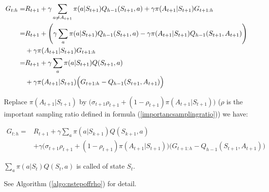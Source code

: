 \begin{equation}
	\begin{split}
		G_{t:h} =& R_{t+1}+\gamma \sum_{a\neq A_{t+1}} \pi(a|S_{t+1}) Q_{h-1}(S_{t+1},a) + \gamma \pi(A_{t+1}|S_{t+1})G_{t+1:h} \\
		=& R_{t+1} + \mleft (\gamma \sum_a \pi(a|S_{t+1})Q_{h-1}(S_{t+1},a) - \gamma \pi(A_{t+1}|S_{t+1})Q_{h-1}(S_{t+1},A_{t+1}) \mright)\\
		&+ \gamma \pi(A_{t+1}|S_{t+1})G_{t+1:h} \\
		=& R_{t+1} + \gamma \sum_a \pi(a|S_{t+1})Q(S_{t+1},a) \\
		&+ \gamma \pi(A_{t+1}|S_{t+1})\Big (G_{t+1:h} -Q_{h-1}(S_{t+1},A_{t+1})  \Big)
	\end{split}
\end{equation}

Replace $\pi(A_{t+1}|S_{t+1})$ by $\Big(\sigma_{t+1} \rho_{t+1} + (1-\rho_{t+1})\pi(A_{t+1}|S_{t+1}) \Big)$ ($\rho$ is the important sampling ratio defined in formula (\ref{importancsamplingratio})) we have:

\begin{equation}
	\begin{split}
		G_{t:h} =& R_{t+1} + \gamma \sum_a \pi(a|S_{k+1})Q(S_{k+1},a) \\
		&+ \gamma \Big ( \sigma_{t+1} \rho_{t+1} + (1-\rho_{t+1})\pi(A_{t+1}|S_{t+1}) \Big) \Big(G_{t+1:h} -Q_{h-1}(S_{t+1},A_{t+1}) \Big)
	\end{split}
\end{equation}


$\sum\limits_a \pi(a|S_{t})Q(S_{t},a)$ is called  of state $S_t$.


See Algorithm (\ref{algo:nstepoffrho}) for detail.


